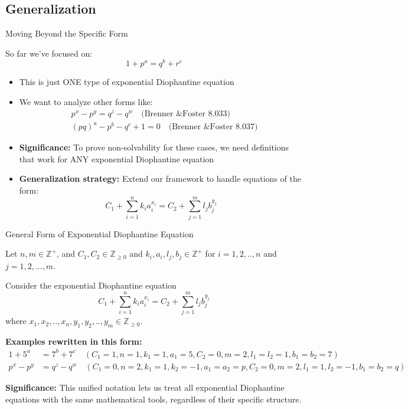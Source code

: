 \subsection{Generalization}
\begin{frame}{Moving Beyond the Specific Form}
    \begin{block}{So far we've focused on:}
        \[1+p^a = q^b + r^c\]
    \end{block}
    
    \begin{itemize}
        \item This is just ONE type of exponential Diophantine equation
        \item We want to analyze other forms like:
        \begin{align*}
            &p^x - p^y = q^z - q^w \quad \text{(Brenner \& Foster 8.033)}\\
            &(pq)^a - p^b - q^c + 1 = 0 \quad \text{(Brenner \& Foster 8.037)}
        \end{align*}
        
        \item \textbf{Significance:} To prove non-solvability for these cases, we need definitions that work for ANY exponential Diophantine equation
        
        \item \textbf{Generalization strategy:} Extend our framework to handle equations of the form:
        \[C_1 + \sum_{i=1}^n k_i a_i^{x_i} = C_2 + \sum_{j=1}^m l_j b_j^{y_j}\]
    \end{itemize}
\end{frame}

\begin{frame}{General Form of Exponential Diophantine Equation}
    \begin{definition}
        Let $n,m \in \mathbb{Z}^{+}$, and $C_1, C_2 \in \mathbb{Z}_{\geq 0}$ and $k_i, a_i, l_j, b_j \in \mathbb{Z}^{+}$ for $i=1,2,..,n$ and $j=1,2,...,m$. 
        
        Consider the exponential Diophantine equation
        \begin{equation}
            C_1 + \sum_{i=1}^n k_i a_i^{x_i} = C_2 + \sum_{j=1}^m l_j b_j^{y_j} \label{general}
        \end{equation}
        where $x_1,x_2,..,x_n, y_1,y_2,..,y_m \in \mathbb{Z}_{\geq 0}$.
    \end{definition}
    
    \textbf{Examples rewritten in this form:}
    \begin{align*}
        1 + 5^a &= 7^b + 7^c \quad (C_1=1, n=1, k_1=1, a_1=5, C_2=0, m=2, l_1=l_2=1, b_1=b_2=7)\\
        p^x - p^y &= q^z - q^w \quad (C_1=0, n=2, k_1=1, k_2=-1, a_1=a_2=p, C_2=0, m=2, l_1=1, l_2=-1, b_1=b_2=q)
    \end{align*}
    
    \textbf{Significance:} This unified notation lets us treat all exponential Diophantine equations with the same mathematical tools, regardless of their specific structure.
\end{frame}

